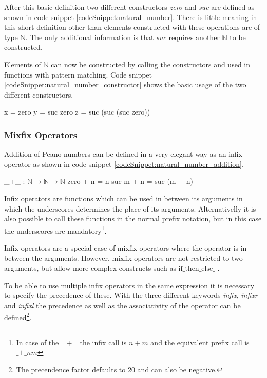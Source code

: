 After this basic definition two different constructors \emph{zero} and \emph{suc} are defined as shown in code snippet \ref{codeSnippet:natural_number}.
There is little meaning in this short definition other than elements constructed with these operations are of type $\mathbb{N}$.
The only additional information is that \emph{suc} requires another $\mathbb{N}$ to be constructed.

Elements of $\mathbb{N}$ can now be constructed by calling the constructors and used in functions with pattern matching. 
Code snippet \ref{codeSnippet:natural_number_constructor} shows the basic usage of the two different constructors.

\begin{codesnippet}[mathescape=true, caption={Some peano numbers}, label={codeSnippet:natural_number_constructor}]
x = zero
y = suc zero
z = suc (suc (suc zero))
\end{codesnippet}

\subsubsection{Mixfix Operators}
Addition of Peano numbers can be defined in a very elegant way as an infix operator as shown in code snippet \ref{codeSnippet:natural_number_addition}.

\begin{codesnippet}[mathescape=true, caption={Peano numbers addition}, label={codeSnippet:natural_number_addition}]
_+_ : $\mathbb{N} \rightarrow \mathbb{N} \rightarrow \mathbb{N}$
zero  + n = n
suc m + n = suc (m + n)
\end{codesnippet}

Infix operators are functions which can be used in between its arguments in which the underscores determines the place of its arguments.
Alternativelly it is also possible to call these functions in the normal prefix notation, but in this case the underscores are mandatory\footnote{In case of the \_+\_ the infix call is $n + m$ and the equivalent prefix call is $\text{\_+\_} n m$}.

Infix operators are a special case of mixfix operators where the operator is in between the arguments.
However, mixfix operators are not restricted to two arguments, but allow more complex constructs such as $\text{if\_then\_else\_}$ \cite{AgdaReadTheDocs}.

To be able to use multiple infix operators in the same expression it is necessary to specify the precedence of these.
With the three different keywords \emph{infix}, \emph{infixr} and \emph{infixl} the precedence as well as the associativity of the operator can be defined\footnote{The precendence factor defaults to 20 and can also be negative.}.

